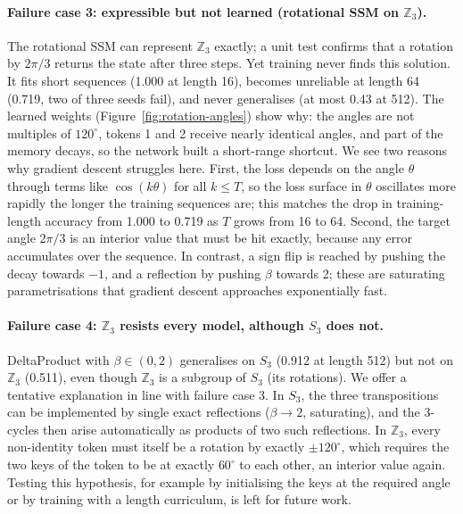 \paragraph{Failure case 3: expressible but not learned (rotational SSM on $\mathbb{Z}_3$).} The rotational SSM can
represent $\mathbb{Z}_3$ exactly; a unit test confirms that a rotation by $2\pi/3$ returns the state after three
steps. Yet training never finds this solution. It fits short sequences (1.000 at length 16), becomes unreliable at
length 64 (0.719, two of three seeds fail), and never generalises (at most 0.43 at 512). The learned weights
(Figure~\ref{fig:rotation-angles}) show why: the angles are not multiples of $120^\circ$, tokens 1 and 2 receive
nearly identical angles, and part of the memory decays, so the network built a short-range shortcut. We see two
reasons why gradient descent struggles here. First, the loss depends on the angle $\theta$ through terms like
$\cos(k\theta)$ for all $k\le T$, so the loss surface in $\theta$ oscillates more rapidly the longer the training
sequences are; this matches the drop in training-length accuracy from 1.000 to 0.719 as $T$ grows from 16 to 64.
Second, the target angle $2\pi/3$ is an interior value that must be hit exactly, because any error accumulates over
the sequence. In contrast, a sign flip is reached by pushing the decay towards $-1$, and a reflection by pushing
$\beta$ towards 2; these are saturating parametrisations that gradient descent approaches exponentially fast.

\paragraph{Failure case 4: $\mathbb{Z}_3$ resists every model, although $S_3$ does not.} DeltaProduct with
$\beta\in(0,2)$ generalises on $S_3$ (0.912 at length 512) but not on $\mathbb{Z}_3$ (0.511), even though
$\mathbb{Z}_3$ is a subgroup of $S_3$ (its rotations). We offer a tentative explanation in line with failure case 3.
In $S_3$, the three transpositions can be implemented by single exact reflections ($\beta\to 2$, saturating), and
the 3-cycles then arise automatically as products of two such reflections. In $\mathbb{Z}_3$, every non-identity
token must itself be a rotation by exactly $\pm120^\circ$, which requires the two keys of the token to be at
exactly $60^\circ$ to each other, an interior value again. Testing this hypothesis, for example by initialising
the keys at the required angle or by training with a length curriculum, is left for future work.


